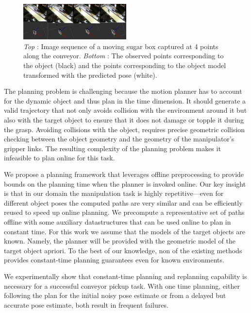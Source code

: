 \documentclass[conference]{IEEEtran}
\begin{document}
\begin{figure}
    \centering
    \includegraphics[width=0.5\textwidth]{figs/pose_sequence.png}
    \caption{\textit{Top} : Image sequence of a moving sugar box captured at 4 points along the conveyor. \textit{Bottom} : The observed points corresponding to the object (black) and the points corresponding to the object model transformed with the predicted pose (white).}
    \label{fig:pose_sequence}
\end{figure}
The planning problem is challenging because the motion planner has to account for the dynamic object and thus plan in the time dimension. It should generate a valid trajectory that not only avoids collision with the environment around it but also with the target object to ensure that it does not damage or topple it during the grasp. Avoiding collisions with the object, requires precise geometric collision checking between the object geometry and the geometry of the manipulator's gripper links. The resulting complexity of the planning problem makes it infeasible to plan online for this task.

We propose a planning framework that leverages offline preprocessing to provide bounds on the planning time when the planner is invoked online. Our key insight is that in our domain the manipulation task is highly repetitive---even for different object poses the computed paths are very similar and can be efficiently reused to speed up online planning. We precompute a representative set of paths offline with some auxiliary datastructures that can be used online to plan in constant time. For this work we assume that the models of the target objects are known. Namely, the planner will be provided with the geometric model of the target object apriori. To the best of our knowledge, non of the existing methods provides constant-time planning guarantees even for known environments. 

%
We experimentally show that constant-time planning and replanning capability is necessary for a successful conveyor pickup task. With one time planning, either following the plan for the initial noisy pose estimate or from a delayed but accurate pose estimate, both result in frequent failures.
\end{document}
